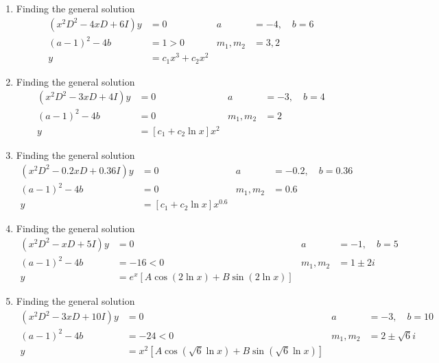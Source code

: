 \begin{enumerate}
    \item Finding the general solution
          \begin{align}
              (x^{2}D^{2} - 4xD + 6I)y & = 0                       & a            & = -4, \quad b= 6 \\
              (a-1)^{2}-4b             & = 1 > 0                   & m_{1}, m_{2} & =  3, 2          \\
              y                        & = c_{1}x^{3} + c_{2}x^{2}
          \end{align}

    \item Finding the general solution
          \begin{align}
              (x^{2}D^{2} - 3xD + 4I)y & = 0                           & a            & = -3, \quad b= 4 \\
              (a-1)^{2}-4b             & = 0                           & m_{1}, m_{2} & =  2             \\
              y                        & = [ c_{1} + c_{2}\ln x ]x^{2}
          \end{align}

    \item Finding the general solution
          \begin{align}
              (x^{2}D^{2} - 0.2xD + 0.36I)y & = 0                              & a            & = -0.2, \quad b= 0.36 \\
              (a-1)^{2}-4b                  & = 0                              & m_{1}, m_{2} & =  0.6                \\
              y                             & = [ c_{1} + c_{2} \ln x ]x^{0.6}
          \end{align}

    \item Finding the general solution
          \begin{align}
              (x^{2}D^{2} - xD + 5I)y & = 0                                      & a            & = -1, \quad b= 5 \\
              (a-1)^{2}-4b            & = -16 < 0                                & m_{1}, m_{2} & =  1 \pm 2i      \\
              y                       & = e^{x}[A\cos(2 \ln x) + B\sin(2 \ln x)]
          \end{align}

    \item Finding the general solution
          \begin{align}
              (x^{2}D^{2} - 3xD + 10I)y & = 0                                                   & a            & = -3, \quad b= 10  \\
              (a-1)^{2}-4b              & = -24 < 0                                             & m_{1}, m_{2} & =  2 \pm \sqrt{6}i \\
              y                         & = x^{2} [A\cos(\sqrt{6}\ln x) + B\sin(\sqrt{6}\ln x)]
          \end{align}


\end{enumerate}
